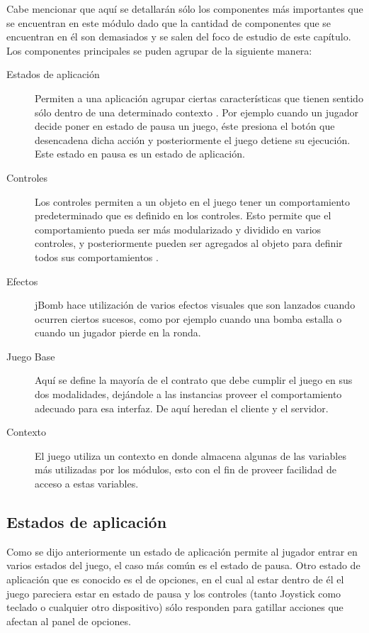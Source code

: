 \documentclass[a4paper,12pt,openany,oneside]{book}
\begin{document}
Cabe mencionar que aquí se detallarán sólo los componentes más importantes que se encuentran en este módulo dado que la cantidad de componentes que se encuentran en él son demasiados y se salen del foco de estudio de este capítulo. Los componentes principales se puden agrupar de la siguiente manera:
\begin{description}
\item[Estados de aplicación] Permiten a una aplicación agrupar ciertas características que tienen sentido sólo dentro de una determinado contexto \cite{BEGINNERS}. Por ejemplo cuando un jugador decide poner en estado de pausa un juego, éste presiona el botón que desencadena dicha acción y posteriormente el juego detiene su ejecución. Este estado en pausa es un estado de aplicación.
\item[Controles] Los controles permiten a un objeto en el juego tener un comportamiento predeterminado que es definido en los controles. Esto permite que el comportamiento pueda ser más modularizado y dividido en varios controles, y posteriormente pueden ser agregados al objeto para definir todos sus comportamientos \cite{BEGINNERS}.
\item[Efectos] jBomb hace utilización de varios efectos visuales que son lanzados cuando ocurren ciertos sucesos, como por ejemplo cuando una bomba estalla o cuando un jugador pierde en la ronda\cite{BEGINNERS}.
\item[Juego Base] Aquí se define la mayoría de el contrato que debe cumplir el juego en sus dos modalidades, dejándole a las instancias proveer el comportamiento adecuado para esa interfaz. De aquí heredan el cliente y el servidor.
\item[Contexto] El juego utiliza un contexto en donde almacena algunas de las variables más utilizadas por los módulos, esto con el fin de proveer facilidad de acceso a estas variables.
\end{description}
\subsection{Estados de aplicación} Como se dijo anteriormente un estado de aplicación permite al jugador entrar en varios estados del juego, el caso más común es el estado de pausa. Otro estado de aplicación que es conocido es el de opciones, en el cual al estar dentro de él el juego pareciera estar en estado de pausa y los controles (tanto Joystick como teclado o cualquier otro dispositivo) sólo responden para gatillar acciones que afectan al panel de opciones.
\end{document}
